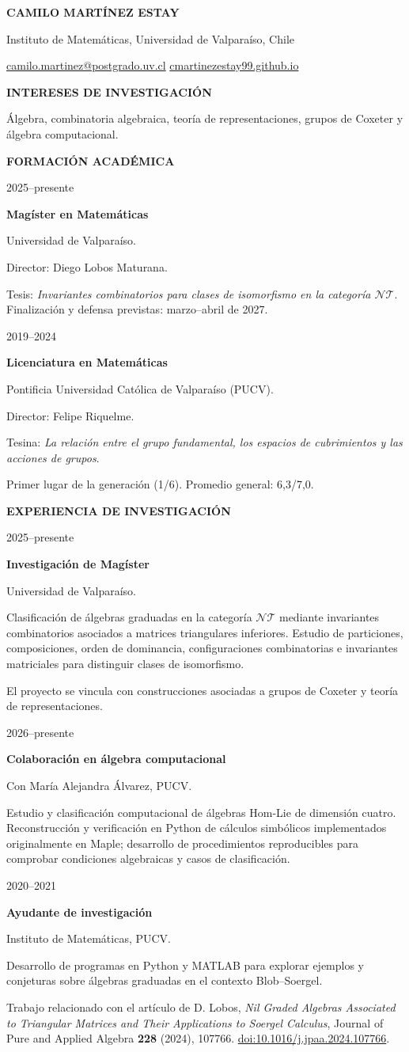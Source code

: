 \documentclass[10pt,a4paper]{article}
\newlength{\datewidth}\setlength{\datewidth}{2.6cm}
\newlength{\colgap}\setlength{\colgap}{.45cm}
\newlength{\bodywidth}\setlength{\bodywidth}{\dimexpr\textwidth-\datewidth-\colgap\relax}
\newcommand{\cvsection}[1]{%
  \par\needspace{4\baselineskip}\vspace{3mm}%
  \hspace*{\dimexpr\datewidth+\colgap\relax}%
  {\color{accent}\bfseries\fontsize{10.5}{13}\selectfont\MakeUppercase{#1}}\par\vspace{2mm}}
\newcommand{\cvrow}[2]{%
  \par\noindent\begin{minipage}[t]{\datewidth}\vspace{0pt}
    \raggedright\small\color{muted}\strut #1
  \end{minipage}\hspace{\colgap}%
  \begin{minipage}[t]{\bodywidth}\vspace{0pt}\raggedright\strut #2\end{minipage}\par\vspace{1.5mm}}
\newcommand{\role}[1]{{\bfseries #1}}
\newcommand{\detail}[1]{\par\vspace{.5mm}#1}
\begin{document}
{\color{accent}\fontsize{25}{29}\selectfont\bfseries CAMILO MARTÍNEZ ESTAY}\par
{}\vspace{2.5mm}
{\small Instituto de Matemáticas, Universidad de Valparaíso, Chile\par
\href{mailto:camilo.martinez@postgrado.uv.cl}{camilo.martinez@postgrado.uv.cl}\quad\textbar\quad
\href{https://cmartinezestay99.github.io}{cmartinezestay99.github.io}}

\cvsection{Intereses de investigación}
\cvrow{}{Álgebra, combinatoria algebraica, teoría de representaciones, grupos de Coxeter y álgebra computacional.}

\cvsection{Formación académica}
\cvrow{2025--presente}{\role{Magíster en Matemáticas}\par
Universidad de Valparaíso.
\detail{Director: Diego Lobos Maturana.}
\detail{Tesis: \emph{Invariantes combinatorios para clases de isomorfismo en la categoría $\mathcal{NT}$}. Finalización y defensa previstas: marzo--abril de 2027.}}
\cvrow{2019--2024}{\role{Licenciatura en Matemáticas}\par
Pontificia Universidad Católica de Valparaíso (PUCV).
\detail{Director: Felipe Riquelme.}
\detail{Tesina: \emph{La relación entre el grupo fundamental, los espacios de cubrimientos y las acciones de grupos}.}
\detail{Primer lugar de la generación (1/6). Promedio general: 6,3/7,0.}}

\cvsection{Experiencia de investigación}
\cvrow{2025--presente}{\role{Investigación de Magíster}\par
Universidad de Valparaíso.
\detail{Clasificación de álgebras graduadas en la categoría $\mathcal{NT}$ mediante invariantes combinatorios asociados a matrices triangulares inferiores. Estudio de particiones, composiciones, orden de dominancia, configuraciones combinatorias e invariantes matriciales para distinguir clases de isomorfismo.}
\detail{El proyecto se vincula con construcciones asociadas a grupos de Coxeter y teoría de representaciones.}}
\cvrow{2026--presente}{\role{Colaboración en álgebra computacional}\par
Con María Alejandra Álvarez, PUCV.
\detail{Estudio y clasificación computacional de álgebras Hom-Lie de dimensión cuatro. Reconstrucción y verificación en Python de cálculos simbólicos implementados originalmente en Maple; desarrollo de procedimientos reproducibles para comprobar condiciones algebraicas y casos de clasificación.}}
\cvrow{2020--2021}{\role{Ayudante de investigación}\par
Instituto de Matemáticas, PUCV.
\detail{Desarrollo de programas en Python y MATLAB para explorar ejemplos y conjeturas sobre álgebras graduadas en el contexto Blob--Soergel.}
\detail{Trabajo relacionado con el artículo de D. Lobos, \emph{Nil Graded Algebras Associated to Triangular Matrices and Their Applications to Soergel Calculus}, Journal of Pure and Applied Algebra \textbf{228} (2024), 107766. \href{https://doi.org/10.1016/j.jpaa.2024.107766}{doi:10.1016/j.jpaa.2024.107766}.}}
\end{document}

